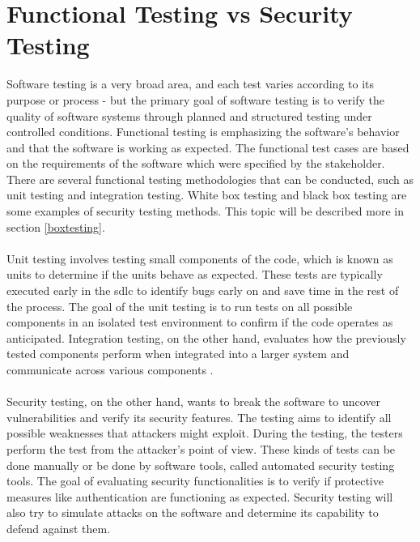 \section{Functional Testing vs Security Testing}
\label{Functional Testing vs Security Testing}
Software testing is a very broad area, and each test varies according to its purpose or process - but the primary goal of software testing is to verify the quality of software systems through planned and structured testing under controlled conditions. Functional testing is emphasizing the software's behavior and that the software is working as expected. The functional test cases are based on the requirements of the software which were specified by the stakeholder. There are several functional testing methodologies that can be conducted, such as unit testing and integration testing\cite{difftesting}. White box testing and black box testing are some examples of security testing methods. This topic will be described more in section \ref{boxtesting}. 
\\~\\
Unit testing involves testing small components of the code, which is known as units to determine if the units behave as expected. These tests are typically executed early in the \acrshort{sdlc} to identify bugs early on and save time in the rest of the process. The goal of the unit testing is to run tests on all possible components in an isolated test environment to confirm if the code operates as anticipated. Integration testing, on the other hand, evaluates how the previously tested components perform when integrated into a larger system and communicate across various components \cite{unitvsintergration}.
\\~\\
Security testing, on the other hand, wants to break the software to uncover vulnerabilities and verify its security features\cite{whysectest}. The testing aims to identify all possible weaknesses that attackers might exploit. During the testing, the testers perform the test from the attacker's point of view. These kinds of tests can be done manually or be done by software tools, called automated security testing tools. The goal of evaluating security functionalities is to verify if protective measures like authentication are functioning as expected. Security testing will also try to simulate attacks on the software and determine its capability to defend against them.





